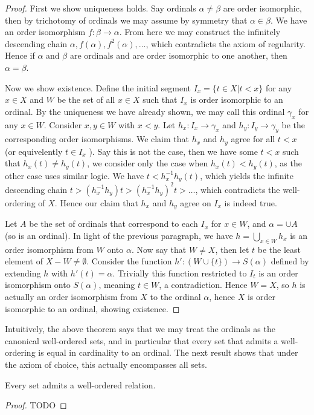 \documentclass[]{article}
\begin{document}
 \begin{proof}
		 First we show uniqueness holds. Say ordinals $\alpha \neq \beta$ are order isomorphic, then by trichotomy of ordinals we may assume by symmetry that $\alpha \in \beta$. We have an order isomorphism $f: \beta \to \alpha$. From here we may construct the infinitely descending chain $\alpha, f(\alpha), f^2(\alpha), \ldots$, which contradicts the axiom of regularity. Hence if $\alpha$ and $\beta$ are ordinals and are order isomorphic to one another, then $\alpha = \beta$.

		 Now we show existence. Define the initial segment $I_x = \{t \in X | t < x\}$ for any $x \in X$ and $W$ be the set of all $x \in X$ such that $I_x$ is order isomorphic to an ordinal. By the uniqueness we have already shown, we may call this ordinal $\gamma_x$ for any $x \in W$. Consider $x, y \in W$ with $x < y$. Let $h_x: I_x \to \gamma_x$ and $h_y: I_y \to \gamma_y$ be the corresponding order isomorphisms. We claim that $h_x$ and $h_y$ agree for all $t < x$ (or equivelently $t \in I_x$ ). Say this is not the case, then we have some $t < x$ such that $h_x(t) \neq h_y(t)$, we consider only the case when  $h_x(t) < h_y(t)$, as the other case uses similar logic. We have $t < h_x^{-1}h_y(t)$, which yields the infinite descending chain $t > (h_x^{-1}h_y)t > (h_x^{-1}h_y)^2t > \ldots$, which contradicts the well-ordering of $X$. Hence our claim that $h_x$ and $h_y$ agree on $I_x$ is indeed true.
		 
		 Let $A$ be the set of ordinals that correspond to each $I_x$ for $x \in W$, and $\alpha = \cup A$ (so \alpha is an ordinal). In light of the previous paragraph, we have $h = \bigcup_{x \in W} h_x$ is an order isomorphism from $W$ onto $\alpha$. Now say that $W \neq X$, then let $t$ be the least element of $X - W \neq \emptyset$. Consider the function $h': (W \cup \{t\}) \to S(\alpha)$ defined by extending $h$ with $h'(t) = \alpha$.  Trivially this function restricted to $I_t$ is an order isomorphism onto $S(\alpha)$, meaning $t \in W$, a contradiction. Hence $W = X$, so $h$ is actually an order isomorphism from $X$ to the ordinal $\alpha$, hence $X$ is order isomorphic to an ordinal, showing existence.
 \end{proof}

 Intuitively, the above theorem says that we may treat the ordinals as the canonical well-ordered sets, and in particular that every set that admits a well-ordering is equal in cardinality to an ordinal. The next result shows that under the axiom of choice, this actually encompasses all sets.

 \begin{thm}  \label{thm:well-ordering}
 	Every set admits a well-ordered relation.
 \end{thm}

 \begin{proof}
 	TODO	
 \end{proof}
		
\end{document}
